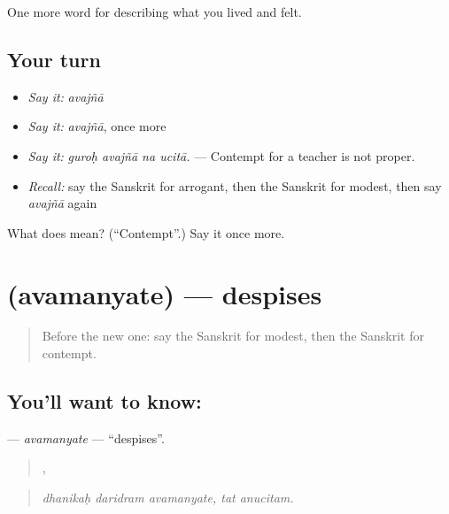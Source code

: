 \begin{grammarlens}[title={What you've built}]
One more word for describing what you lived and felt.
\end{grammarlens}

\subsection*{Your turn}
\begin{itemize}
\raggedright
  \item \emph{Say it:} \emph{avajñā}
  \item \emph{Say it:} \emph{avajñā}, once more
  \item \emph{Say it:} \emph{guroḥ avajñā na ucitā.} — Contempt for a teacher is not proper.
  \item \emph{Recall:} say the Sanskrit for arrogant, then the Sanskrit for modest, then say \emph{avajñā} again
\end{itemize}

\begin{tcolorbox}[breakable,colback=teal!4,colframe=teal!35!black,title={Before you move on}]
What does  mean? (\textquotedblleft{}Contempt\textquotedblright{}.) Say it once more.
\end{tcolorbox}
\section[\texorpdfstring{\sk{अवमन्यते} (avamanyate)}{अवमन्यते (avamanyate)}]{ (avamanyate) — despises}

\label{lesson:SA-C459-avamanyate}



\begin{quote}
Before the new one: say the Sanskrit for modest, then the Sanskrit for contempt.
\end{quote}

\subsection*{You'll want to know: }
\textbf{} — \emph{avamanyate} — \textquotedblleft{}despises\textquotedblright{}.

\begin{quote}
  ,  
\end{quote}

\begin{quote}
\emph{dhanikaḥ daridram avamanyate, tat anucitam.}
\end{quote}

